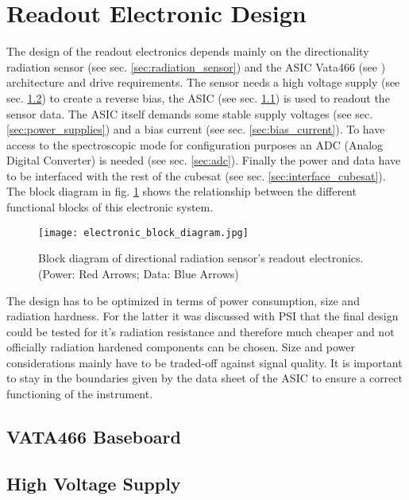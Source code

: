 \section{Readout Electronic Design}
\label{sec:electronic_design}
The design of the readout electronics depends mainly on the directionality radiation sensor (see sec. \ref{sec:radiation_sensor}) and the ASIC Vata466 (see \cite{Meier2016VATA466}) architecture and drive requirements.
The sensor needs a high voltage supply (see sec. \ref{sec:hv_supply}) to create a reverse bias, the ASIC (see sec. \ref{sec:vata466_baseboard}) is used to readout the sensor data.
The ASIC itself demands some stable supply voltages (see sec. \ref{sec:power_supplies}) and a bias current (see sec. \ref{sec:bias_current}).
To have access to the spectroscopic mode for configuration purposes an ADC (Analog Digital Converter) is needed (see sec. \ref{sec:adc}).
Finally the power and data have to be interfaced with the rest of the cubesat (see sec. \ref{sec:interface_cubesat}).
The block diagram in fig. \ref{fig:electronic_block_diagram} shows the relationship between the different functional blocks of this electronic system.

\begin{figure}[H]
    \centering
    \texttt{[image: electronic\_block\_diagram.jpg]}
    \caption[Block Diagram Readout Electronics]{Block diagram of directional radiation sensor's readout electronics. \\    (Power: Red Arrows; Data: Blue Arrows)}
    \label{fig:electronic_block_diagram}
\end{figure}

The design has to be optimized in terms of power consumption, size and radiation hardness. 
For the latter it was discussed with PSI that the final design could be tested for it's radiation resistance and therefore much cheaper and not officially radiation hardened components can be chosen.
Size and power considerations mainly have to be traded-off against signal quality.
%
It is important to stay in the boundaries given by the data sheet of the ASIC to ensure a correct functioning of the instrument.


\subsection{VATA466 Baseboard}
\label{sec:vata466_baseboard}


\subsection{High Voltage Supply}
\label{sec:hv_supply}


